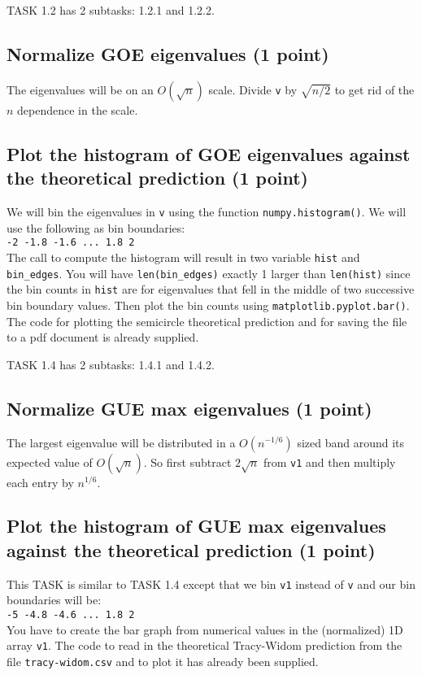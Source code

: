 \documentclass{article}
\begin{document}
TASK 1.2 has 2 subtasks: 1.2.1 and 1.2.2.

\subsection{Normalize GOE eigenvalues (1 point)}

The eigenvalues will be on an $O(\sqrt{n})$ scale. Divide \verb#v# by $\sqrt{n/2}$ to get rid of the $n$ dependence in the scale.

\subsection{Plot the histogram of GOE eigenvalues against the theoretical
prediction (1 point)}

We will bin the eigenvalues in \verb#v# using the function \verb#numpy.histogram()#. We will use the following as bin boundaries:\\
\verb#-2 -1.8 -1.6 ... 1.8 2# \\
The call to compute the histogram will result in two variable \verb#hist# and \verb#bin_edges#. You will have \verb#len(bin_edges)#
exactly 1 larger than \verb#len(hist)# since the bin counts in \verb#hist# are for eigenvalues that fell in the middle of two successive
bin boundary values. Then plot the bin counts using \verb#matplotlib.pyplot.bar()#. The code for plotting the semicircle theoretical
prediction and for saving the file to a pdf document is already supplied.

TASK 1.4 has 2 subtasks: 1.4.1 and 1.4.2.

\subsection{Normalize GUE max eigenvalues (1 point)}

The largest eigenvalue will be distributed in a $O(n^{-1/6})$ sized band around its expected value of $O(\sqrt{n})$. So first subtract $2\sqrt{n}$ from
\verb#v1# and then multiply each entry by $n^{1/6}$.

\subsection{Plot the histogram of GUE max eigenvalues against the theoretical
prediction (1 point)}

This TASK is similar to TASK 1.4 except that we bin \verb#v1# instead of \verb#v# and our bin boundaries will be:\\
\verb#-5 -4.8 -4.6 ... 1.8 2# \\
You have to create the bar graph from numerical values in the (normalized) 1D array \verb#v1#. The code to read in the
theoretical Tracy-Widom prediction from the file \verb#tracy-widom.csv# and to plot it has already been supplied.
\end{document}
